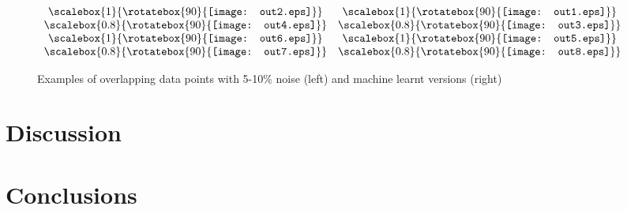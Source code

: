 \documentclass[12pt]{article}
\begin{document}
  \begin{figure}
\begin{center}
\begin{math}
\begin{array}{cc}

\scalebox{1}{\rotatebox{90}{\texttt{[image: out2.eps]}}} & \scalebox{1}{\rotatebox{90}{\texttt{[image: out1.eps]}}} \\
\scalebox{0.8}{\rotatebox{90}{\texttt{[image: out4.eps]}}} & \scalebox{0.8}{\rotatebox{90}{\texttt{[image: out3.eps]}}} \\
\scalebox{1}{\rotatebox{90}{\texttt{[image: out6.eps]}}} & \scalebox{1}{\rotatebox{90}{\texttt{[image: out5.eps]}}} \\
\scalebox{0.8}{\rotatebox{90}{\texttt{[image: out7.eps]}}} & 
\scalebox{0.8}{\rotatebox{90}{\texttt{[image: out8.eps]}}} \\
\end{array}
\end{math}
\caption{Examples of overlapping data points with 5-10\% noise (left) and machine learnt versions (right)}
\end{center}

\end{figure}

\section{Discussion}

\section{Conclusions}






\end{document}
